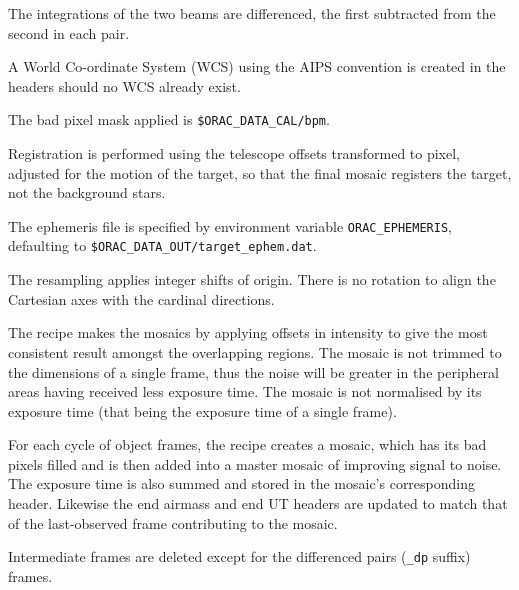 \documentclass[twoside,11pt,nolof]{starlink}
\begin{document}
{{{         \sstitem
         The integrations of the two beams are differenced, the first
         subtracted from the second in each pair.

         \sstitem
         A World Co-ordinate System (WCS) using the AIPS convention is
         created in the headers should no WCS already exist.

         \sstitem
         The bad pixel mask applied is {\tt\$ORAC\_DATA\_CAL/bpm}.

         \sstitem
         Registration is performed using the telescope offsets
         transformed to pixel, adjusted for the motion of the target, so
         that the final mosaic registers the target, not the background stars.

         \sstitem
         The ephemeris file is specified by environment variable
         \texttt{ORAC\_EPHEMERIS}, defaulting to {\tt\$ORAC\_DATA\_OUT/target\_ephem.dat}.

         \sstitem
         The resampling applies integer shifts of origin.   There is no
         rotation to align the Cartesian axes with the cardinal directions.

         \sstitem
         The recipe makes the mosaics by applying offsets in intensity
         to give the most consistent result amongst the overlapping regions.
         The mosaic is not trimmed to the dimensions of a single frame, thus
         the noise will be greater in the peripheral areas having received
         less exposure time.  The mosaic is not normalised by its exposure
         time (that being the exposure time of a single frame).

         \sstitem
         For each cycle of object frames, the recipe creates a mosaic,
         which has its bad pixels filled and is then added into a master
         mosaic of improving signal to noise.  The exposure time is also
         summed and stored in the mosaic's corresponding header.  Likewise
         the end airmass and end UT headers are updated to match that of the
         last-observed frame contributing to the mosaic.

         \sstitem
         Intermediate frames are deleted except for the differenced pairs
         ({\tt\_dp} suffix) frames.
      }
   }
   \label{mnc_ephem_format}
   }
\end{document}
